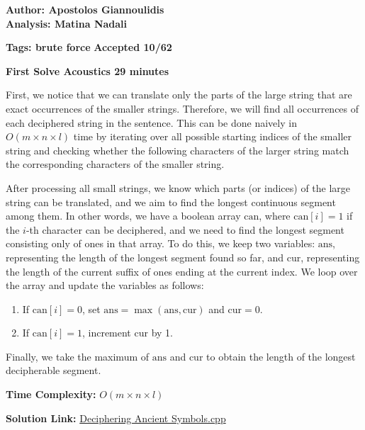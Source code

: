 \documentclass{article}
\begin{document}
\textbf{Author: Apostolos Giannoulidis}\\
\textbf{Analysis: Matina Nadali}

\vspace{2em}
\noindent \textbf{Tags: brute force} 
\hfill \textbf{Accepted 10/62}

\hfill \textbf{First Solve Acoustics 29 minutes}

\vspace{2em}

\noindent First, we notice that we can translate only the parts of the large string that are exact occurrences of the smaller strings. Therefore, we will find all occurrences of each deciphered string in the sentence. This can be done naively in \(O(m \times n \times l)\) time by iterating over all possible starting indices of the smaller string and checking whether the following characters of the larger string match the corresponding characters of the smaller string.

\vspace{1em}

\noindent After processing all small strings, we know which parts (or indices) of the large string can be translated, and we aim to find the longest continuous segment among them. In other words, we have a boolean array \(\text{can}\), where \(\text{can}[i] = 1\) if the \(i\)-th character can be deciphered, and we need to find the longest segment consisting only of ones in that array. To do this, we keep two variables: \(\text{ans}\), representing the length of the longest segment found so far, and \(\text{cur}\), representing the length of the current suffix of ones ending at the current index. We loop over the array and update the variables as follows:

\begin{enumerate}
    \item If \(\text{can}[i] = 0\), set \(\text{ans} = \max(\text{ans}, \text{cur})\) and \(\text{cur} = 0\).
    \item If \(\text{can}[i] = 1\), increment \(\text{cur}\) by 1.
\end{enumerate}

\noindent Finally, we take the maximum of \(\text{ans}\) and \(\text{cur}\) to obtain the length of the longest decipherable segment.


\vspace{1em}

\noindent \textbf{Time Complexity:}
$O(m \times n \times l)$

\vspace{1em}
\noindent \textbf{Solution Link:} 
\href{https://github.com/StathisKons/GRCPC-2024-Editorial-Implementations/blob/main/Sample%20Implementations/D.%20Deciphering%20Ancient%20Symbols.cpp}{Deciphering Ancient Symbols.cpp}
\end{document}
